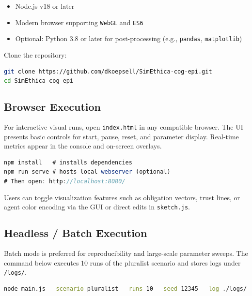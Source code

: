 \documentclass[11pt]{article}
\begin{document}
\begin{itemize}
  \item Node.js v18 or later
  \item Modern browser supporting \texttt{WebGL} and \texttt{ES6}
  \item Optional: Python 3.8 or later for post-processing (e.g., \texttt{pandas}, \texttt{matplotlib})
\end{itemize}

Clone the repository:

\begin{lstlisting}[language=bash,caption={Repository clone command}]
git clone https://github.com/dkoepsell/SimEthica-cog-epi.git
cd SimEthica-cog-epi
\end{lstlisting}

\subsection{Browser Execution}

For interactive visual runs, open \texttt{index.html} in any compatible browser.  
The UI presents basic controls for start, pause, reset, and parameter display.  
Real-time metrics appear in the console and on-screen overlays.

\begin{lstlisting}[language=JavaScript,caption={Launching in browser mode}]
npm install   # installs dependencies
npm run serve # hosts local webserver (optional)
# Then open: http://localhost:8080/
\end{lstlisting}

Users can toggle visualization features such as obligation vectors, trust lines, or agent color encoding via the GUI or direct edits in \texttt{sketch.js}.

\subsection{Headless / Batch Execution}

Batch mode is preferred for reproducibility and large-scale parameter sweeps.  
The command below executes 10 runs of the pluralist scenario and stores logs under \texttt{/logs/}.

\begin{lstlisting}[language=bash,caption={Batch mode with scenario and random seed}]
node main.js --scenario pluralist --runs 10 --seed 12345 --log ./logs/
\end{lstlisting}
\end{document}
